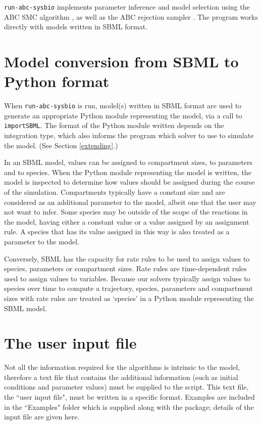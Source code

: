 \documentclass[a4paper]{report}
\begin{document}
\verb$run-abc-sysbio$ implements parameter inference and model selection using the ABC SMC algorithm \citep{Toni2009}, as well as the ABC rejection sampler \citep{ABCrejection}. The program works directly with models written in SBML format. 
\section{Model conversion from SBML to Python format}
When \verb$run-abc-sysbio$ is run, model(s) written in SBML format are used to generate an appropriate Python module representing the model, via a call to \verb$importSBML$. The format of the Python module written depends on the integration type, which also informs the program which solver to use to simulate the model. (See Section \ref{extending}.)

In an SBML model, values can be assigned to compartment sizes, to parameters and to species. When the Python module representing the model is written, the model is inspected to determine how values should be assigned during the course of the simulation. Compartments typically have a constant size and are considered as an additional parameter to the model, albeit one that the user may not want to infer. Some species may be outside of the scope of the reactions in the model, having either a constant value or a value assigned by an assignment rule. A species that has its value assigned in this way is also treated as a parameter to the model.

Conversely, SBML has the capacity for rate rules to be used to assign values to species, parameters or compartment sizes. Rate rules are time-dependent rules used to assign values to variables. Because our solvers typically assign values to species over time to compute a trajectory, species, parameters and compartment sizes with rate rules are treated as `species' in a Python module representing the SBML model.
\section{The user input file}
Not all the information required for the algorithms is intrinsic to the model, therefore a text file that contains the additional information (such as initial conditions and parameter values) must be supplied to the script. This text file,  the ``user input file", must be written in a specific format. Examples are included in the ``Examples" folder which is supplied along with the package; details of the input file are given here.
\end{document}

